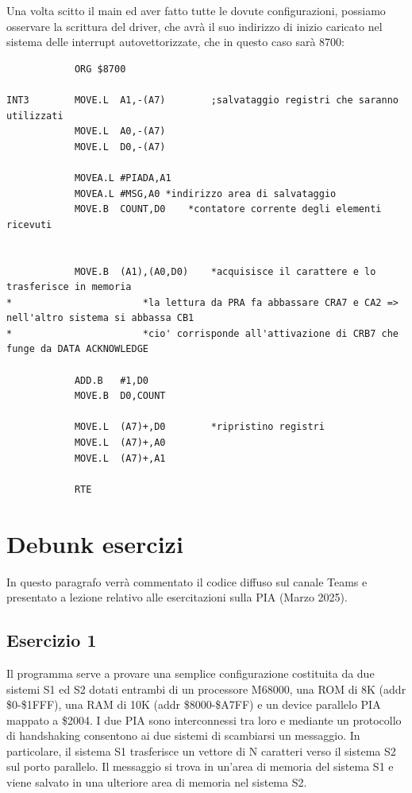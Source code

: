 Una volta scitto il main ed aver fatto tutte le dovute configurazioni, possiamo osservare la scrittura del driver, che avrà il suo indirizzo di inizio caricato nel sistema delle interrupt autovettorizzate, che in questo caso sarà 8700:
\begin{lstlisting}
            ORG $8700		

INT3        MOVE.L  A1,-(A7)		;salvataggio registri che saranno utilizzati
            MOVE.L  A0,-(A7)
            MOVE.L  D0,-(A7)

            MOVEA.L	#PIADA,A1
            MOVEA.L	#MSG,A0	*indirizzo area di salvataggio              
            MOVE.B	COUNT,D0	*contatore corrente degli elementi ricevuti

    
            MOVE.B 	(A1),(A0,D0)	*acquisisce il carattere e lo trasferisce in memoria
*						*la lettura da PRA fa abbassare CRA7 e CA2 => nell'altro sistema si abbassa CB1
*						*cio' corrisponde all'attivazione di CRB7 che funge da DATA ACKNOWLEDGE
    
            ADD.B	#1,D0
            MOVE.B	D0,COUNT

            MOVE.L  (A7)+,D0		*ripristino registri 
            MOVE.L  (A7)+,A0
            MOVE.L  (A7)+,A1
            
            RTE
\end{lstlisting}


\section{Debunk esercizi}
In questo paragrafo verrà commentato il codice diffuso sul canale Teams e presentato a lezione relativo alle esercitazioni sulla PIA (Marzo 2025).

\subsection{Esercizio 1} \label{par:es_1_1}
Il programma serve a provare una semplice configurazione costituita da due sistemi S1 ed S2 dotati entrambi di un processore M68000, una ROM di 8K (addr \$0-\$1FFF), una RAM di 10K (addr \$8000-\$A7FF) e un device parallelo PIA mappato a \$2004.
I due PIA sono interconnessi tra loro e mediante un protocollo di handshaking consentono ai due sistemi di scambiarsi un messaggio. In particolare, il sistema S1 trasferisce un vettore di N caratteri verso il sistema S2 sul porto parallelo. Il messaggio si trova in un'area di memoria del sistema S1 e viene salvato in una ulteriore area di memoria nel sistema S2.

